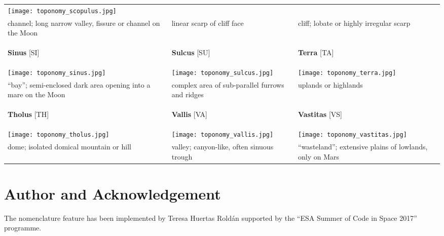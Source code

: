 \begin{longtable}{p{45mm}|p{45mm}|p{45mm}}
\texttt{[image: toponomy\_scopulus.jpg]} \\
channel; long narrow valley, fissure or channel on the Moon & linear scarp of cliff face & cliff; lobate or highly irregular scarp \\\midrule
\begin{center}\textbf{Sinus} [SI]\end{center} & \begin{center}\textbf{Sulcus} [SU]\end{center} & \begin{center}\textbf{Terra} [TA]\end{center} \\
\texttt{[image: toponomy\_sinus.jpg]} & 
\texttt{[image: toponomy\_sulcus.jpg]} & 
\texttt{[image: toponomy\_terra.jpg]} \\
``bay''; semi-enclosed dark area opening into a mare on the Moon & complex area of sub-parallel furrows and ridges & uplands or highlands \\\midrule
\begin{center}\textbf{Tholus} [TH]\end{center} & \begin{center}\textbf{Vallis} [VA]\end{center} & \begin{center}\textbf{Vastitas} [VS]\end{center}  \\
\texttt{[image: toponomy\_tholus.jpg]} & 
\texttt{[image: toponomy\_vallis.jpg]} & 
\texttt{[image: toponomy\_vastitas.jpg]} \\
dome; isolated domical mountain or hill & valley; canyon-like, often sinuous trough & ``wasteland''; extensive plains of lowlands, only on Mars \\\bottomrule
\end{longtable}

\section*{Author and Acknowledgement}
\label{sec:Nomenclature:Acknowledgments}
The nomenclature feature has been implemented by Teresa Huertas Roldán supported by the ``ESA Summer of Code in Space 2017'' programme.


